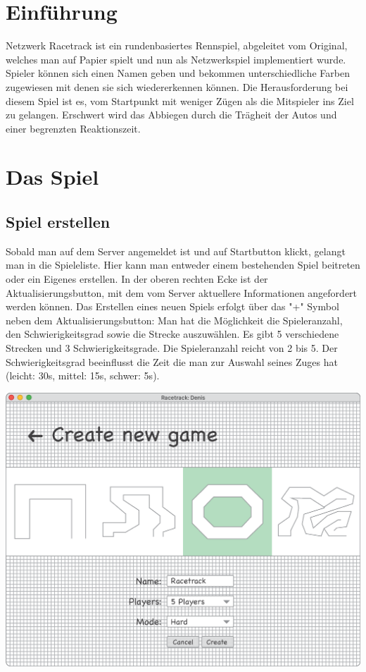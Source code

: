 \documentclass[a0, portrait, english, ngerman]{a0poster}
\begin{document}
\begin{multicols}{3}
\large
\centering
\section{Einführung}

Netzwerk Racetrack ist ein rundenbasiertes Rennspiel, abgeleitet vom Original, welches man auf Papier spielt und nun als Netzwerkspiel implementiert wurde. Spieler können sich einen Namen geben und bekommen unterschiedliche Farben zugewiesen mit denen sie sich wiedererkennen können. Die Herausforderung bei diesem Spiel ist es, vom Startpunkt mit weniger Zügen als die Mitspieler ins Ziel zu gelangen. Erschwert wird das Abbiegen durch die Trägheit der Autos und einer begrenzten Reaktionszeit.\\

\section{Das Spiel}

\subsection{Spiel erstellen}

Sobald man auf dem Server angemeldet ist und auf Startbutton klickt, gelangt man in die Spieleliste. Hier kann man entweder einem bestehenden Spiel beitreten oder ein Eigenes erstellen. In der oberen rechten Ecke ist der Aktualisierungsbutton, mit dem vom Server aktuellere Informationen angefordert werden können. Das Erstellen eines neuen Spiels erfolgt über das "+" Symbol neben dem Aktualisierungsbutton: Man hat die Möglichkeit die Spieleranzahl, den Schwierigkeitsgrad sowie die Strecke auszuwählen. Es gibt 5 verschiedene Strecken und 3 Schwierigkeitsgrade. Die Spieleranzahl reicht von 2 bis 5. Der Schwierigkeitsgrad beeinflusst die Zeit die man zur Auswahl seines Zuges hat (leicht: 30s, mittel: 15s, schwer: 5s).

\vspace{0.5cm}
\centering \includegraphics[scale=0.85]{images/CreateGame.eps} \\


\end{multicols}
\end{document}
